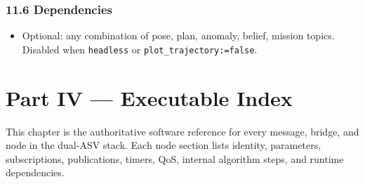 \subsection{11.6 Dependencies}


\begin{itemize}[leftmargin=*]
\item Optional: any combination of pose, plan, anomaly, belief, mission topics. Disabled when \texttt{headless} or \texttt{plot\_trajectory:=false}.
\end{itemize}




\chapter{Part IV --- Executable Index}
\label{ch:ros-catalog}

This chapter is the authoritative software reference for every message, bridge, and node in the dual-ASV stack. Each node section lists identity, parameters, subscriptions, publications, timers, QoS, internal algorithm steps, and runtime dependencies.


